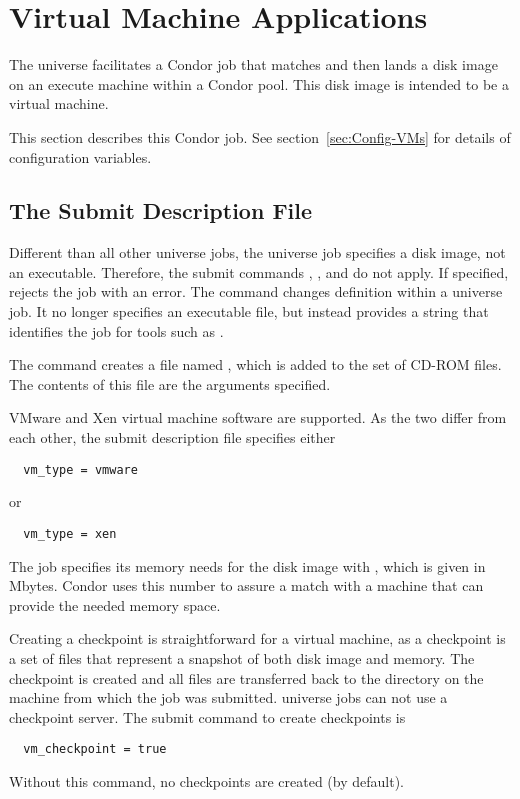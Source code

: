\section{\label{sec:vmuniverse}Virtual Machine Applications}

The  universe facilitates a Condor job
that matches and then lands a disk image on an execute machine
within a Condor pool.
This disk image is intended to be a virtual machine.

This section describes this Condor job.
See section~\ref{sec:Config-VMs}
for details of configuration variables.

\subsection{\label{sec:vm-submitfile}The Submit Description File}

Different than all other universe jobs,
the  universe job specifies a disk image,
not an executable.
Therefore, the submit commands , ,
and  do not apply.
If specified,  rejects the job with an error.
The  command changes definition within a
 universe job.
It no longer specifies an executable file, but instead
provides a string that identifies the job for tools such
as .

The  command creates a file named ,
which is added to the set of CD-ROM files.
The contents of this file are the arguments specified.

VMware and Xen virtual machine software are supported.
As the two differ from each other, the submit description file
specifies either
\begin{verbatim}
  vm_type = vmware
\end{verbatim}
or
\begin{verbatim}
  vm_type = xen
\end{verbatim}

The job specifies its memory needs 
for the disk image with ,
which is given in Mbytes.
Condor uses this number to assure a match with a machine
that can provide the needed memory space.

Creating a checkpoint is straightforward for a virtual machine,
as a checkpoint is a set of files that represent
a snapshot of both disk image and memory.
The checkpoint is created and all files are transferred back
to the  directory on the machine from which
the job was submitted.
 universe jobs can not use a checkpoint server.
The submit command to create checkpoints is
\begin{verbatim}
  vm_checkpoint = true
\end{verbatim}
Without this command, no checkpoints are created (by default).

